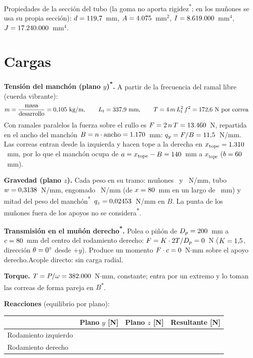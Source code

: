\documentclass[11pt,a4paper]{article}
\newcommand{\supu}{\textsuperscript{*}}   %
\begin{document}
Propiedades de la sección del tubo (la goma no aporta rigidez\supu; en los muñones se usa su propia sección): $d=\num{119.7}$~mm, $A=\num{4075}$~mm$^2$, $I=\num{8619000}$~mm$^4$, $J=\num{17240000}$~mm$^4$.

\section{Cargas}
\textbf{Tensión del manchón (plano $y$)\supu.} A partir de la frecuencia del ramal libre (cuerda vibrante):
\[
m=\frac{\text{masa}}{\text{desarrollo}}=\num{0.105}~\text{kg/m},\qquad
L_t=\num{337.9}~\text{mm},\qquad
T=4\,m\,L_t^2\,f^2=\num{172.6}~\text{N por correa}
\]
Con ramales paralelos la fuerza sobre el rullo es $F=2\,n\,T=\num{13460}$~N, repartida en el ancho del
manchón $B=n\cdot\text{ancho}=\num{1170}$~mm: $q_y=F/B=\num{11.5}$~N/mm. Las correas entran desde la izquierda y
hacen tope a la derecha en $x_{\text{tope}}=\num{1310}$~mm, por lo que el manchón ocupa de $a=x_{\text{tope}}-B=\num{140}$~mm
a $x_{\text{tope}}$ ($b=\num{60}$~mm).

\textbf{Gravedad (plano $z$).} Cada peso en su tramo: muñones \vwmI\ y \vwmD~N/mm, tubo $w=\num{0.3138}$~N/mm,
engomado \vwg~N/mm (de $x=\num{80}$~mm en un largo de \vLg~mm) y mitad del peso del manchón\supu\
$q_z=\num{0.02453}$~N/mm en $B$. La punta de los muñones fuera de los apoyos no se considera\supu.

\textbf{Transmisión en el muñón derecho\supu.} \ifnum{} Polea o piñón de $D_p=\num{200}$~mm a $c=\num{80}$~mm del
centro del rodamiento derecho: $F=K\cdot 2T/D_p=\num{0}$~N ($K=\num{1.5}$, dirección $\theta=\num{0}^\circ$ desde $+y$).
Produce un momento $F\cdot c=\num{0}$~N$\cdot$mm sobre el apoyo derecho.\else Acople directo: sin carga radial.\fi

\textbf{Torque.} $T=P/\omega=\num{382000}$~N$\cdot$mm, constante; entra por un extremo y lo toman las
correas de forma pareja en $B$\supu.

\textbf{Reacciones} (equilibrio por plano):
\begin{center}
\begin{tabular}{lrrr}
\toprule
 & Plano $y$ [N] & Plano $z$ [N] & Resultante [N] \\
\midrule
Rodamiento izquierdo & \vRunoy & \vRunoz & \vRuno \\
Rodamiento derecho   & \vRdosy & \vRdosz & \vRdos \\
\bottomrule
\end{tabular}
\end{center}
\end{document}
